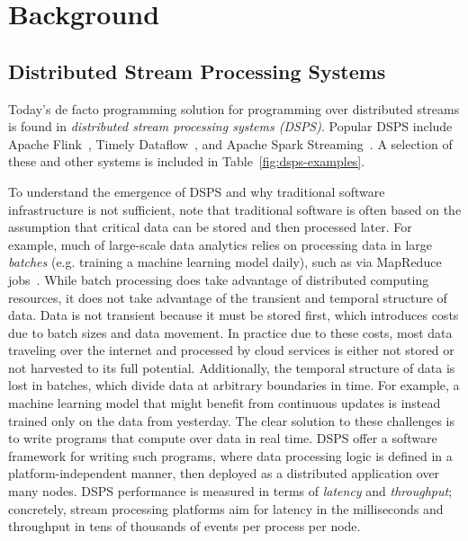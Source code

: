 \chapter{Background}
\label{cha:background}

\section{Distributed Stream Processing Systems}

Today's de facto programming solution for programming over
distributed streams
is found in \emph{distributed stream processing systems (DSPS)}.
Popular DSPS include
Apache Flink~\cite{Flink,Flink2015},
Timely Dataflow~\cite{Timely,Naiad2013},
and Apache Spark Streaming~\cite{SparkStreaming,Spark2013}.
A selection of these and other systems is included in Table~\ref{fig:dsps-examples}.

To understand the emergence of DSPS and why traditional software infrastructure
is not sufficient, note that traditional software
is often based on the assumption that
critical data can be stored and then processed later.
For example,
much of large-scale data analytics relies on processing data in large
\emph{batches} (e.g. training a machine learning model daily),
such as via MapReduce jobs~\cite{dean2008mapreduce}.
While batch processing
does take advantage of distributed computing resources,
it does not take advantage of the transient and temporal structure of data.
Data is not transient because it must be stored first,
which introduces costs due to batch sizes and data movement.
In practice due to these costs, most data traveling over the internet
and processed by cloud services is either not stored or not harvested to its full potential.
Additionally, the temporal structure of data is lost in batches, which divide
data at arbitrary boundaries in time.
For example, a machine learning model that might benefit from continuous updates is instead trained only on the data from yesterday.
The clear solution to these challenges is to write programs that compute over data in real time.
DSPS offer a software framework for writing such programs, where data processing logic is defined in a platform-independent manner,
then deployed as a distributed application over many nodes.
DSPS performance is measured in terms of \emph{latency} and \emph{throughput};
concretely, stream processing platforms aim for latency in the milliseconds and throughput in tens of thousands of events per process per node.

